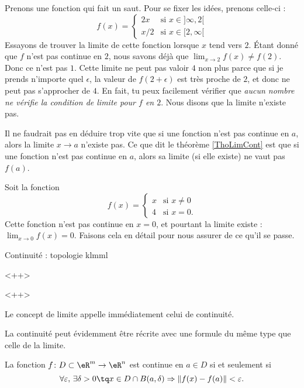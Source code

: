 Prenons une fonction qui fait un saut. Pour se fixer les idées, prenons celle-ci :
\begin{equation}    \label{EqnCtOEL}
f(x)=
\begin{cases}
2x&\text{si }x\in]\infty,2[\\
x/2&\text{si }x\in[2,\infty[
\end{cases}
\end{equation}  
Essayons de trouver la limite de cette fonction lorsque $x$ tend vers $2$. Étant donné que $f$ n'est pas continue en $2$, nous savons déjà que $\lim_{x\to 2}f(x)\neq f(2)$. Donc ce n'est pas $1$. Cette limite ne peut pas valoir $4$ non plus parce que si je prends n'importe quel $\epsilon$, la valeur de $f(2+\epsilon)$ est très proche de $2$, et donc ne peut pas s'approcher de $4$. En fait, tu peux facilement vérifier que \emph{aucun nombre ne vérifie la condition de limite pour $f$ en $2$}. Nous disons que la limite n'existe pas.

Il ne faudrait pas en déduire trop vite que si une fonction n'est pas continue en \( a\), alors la limite \( x\to a\) n'existe pas. Ce que dit le théorème \ref{ThoLimCont} est que si une fonction n'est pas continue en \( a\), alors sa limite (si elle existe) ne vaut pas \( f(a)\).

\begin{example}     \label{EXooKREUooLeuIlv}
    Soit la fonction
    \begin{equation}
        f(x)=\begin{cases}
            x    &   \text{si } x\neq 0\\
            4    &    \text{si } x=0.
        \end{cases}
    \end{equation}
    Cette fonction n'est pas continue en \( x=0\), et pourtant la limite existe : \( \lim_{x\to 0} f(x)=0\). Faisons cela en détail pour nous assurer de ce qu'il se passe.

    \begin{subproof}
        \item[Continuité : topologie]
            klmml
    \end{subproof}
    <++>
\end{example}
<++>

Le concept de limite appelle immédiatement celui de continuité.

La continuité peut évidemment être récrite avec une formule du même type que celle de la limite.
\begin{proposition}
	La fonction $f\colon D\subset\eR^m\to \eR^n$ est continue en $a\in D$ si et seulement si
	\begin{equation}
		\forall\varepsilon,\,\exists\delta>0\tq x\in D\cap B(a,\delta)\Rightarrow \| f(x)-f(a) \|<\varepsilon.
	\end{equation}
\end{proposition}


